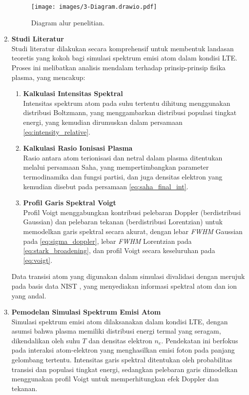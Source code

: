 \begin{enumerate}

    \begin{figure}[H]
        \centering
        \texttt{[image: images/3-Diagram.drawio.pdf]}
        \caption{Diagram alur penelitian.}
        \label{diagram}
    \end{figure}

    \item \textbf{Studi Literatur} \\
    Studi literatur dilakukan secara komprehensif untuk membentuk landasan teoretis yang kokoh bagi simulasi spektrum emisi atom dalam kondisi LTE. Proses ini melibatkan analisis mendalam terhadap prinsip-prinsip fisika plasma, yang mencakup:
    \begin{enumerate}
      \item \textbf{Kalkulasi Intensitas Spektral} \\
      Intensitas spektrum atom pada suhu tertentu dihitung menggunakan distribusi Boltzmann, yang menggambarkan distribusi populasi tingkat energi, yang kemudian dirumuskan dalam persamaan \eqref{eq:intensity_relative}.

      \item \textbf{Kalkulasi Rasio Ionisasi Plasma} \\
      Rasio antara atom terionisasi dan netral dalam plasma ditentukan melalui persamaan Saha, yang mempertimbangkan parameter termodinamika dan fungsi partisi, dan juga densitas elektron yang kemudian disebut pada persamaan \eqref{eq:saha_final_int}.

      \item \textbf{Profil Garis Spektral Voigt} \\
      Profil Voigt menggabungkan kontribusi pelebaran Doppler (berdistribusi Gaussian) dan pelebaran tekanan (berdistribusi Lorentzian) untuk memodelkan garis spektral secara akurat, dengan lebar \textit{FWHM} Gaussian pada \eqref{eq:sigma_doppler}, lebar \textit{FWHM} Lorentzian pada \eqref{eq:stark_broadening}, dan profil Voigt secara keseluruhan pada \eqref{eq:voigt}.
    \end{enumerate}

    Data transisi atom yang digunakan dalam simulasi divalidasi dengan merujuk pada basis data NIST \citep{Kramida2023}, yang menyediakan informasi spektral atom dan ion yang andal.

    \item \textbf{Pemodelan Simulasi Spektrum Emisi Atom} \\
    Simulasi spektrum emisi atom dilaksanakan dalam kondisi LTE, dengan asumsi bahwa plasma memiliki distribusi energi termal yang seragam, dikendalikan oleh suhu \(T\) dan densitas elektron \(n_e\). Pendekatan ini berfokus pada interaksi atom-elektron yang menghasilkan emisi foton pada panjang gelombang tertentu. Intensitas garis spektral ditentukan oleh probabilitas transisi dan populasi tingkat energi, sedangkan pelebaran garis dimodelkan menggunakan profil Voigt untuk memperhitungkan efek Doppler dan tekanan.


\end{enumerate}
